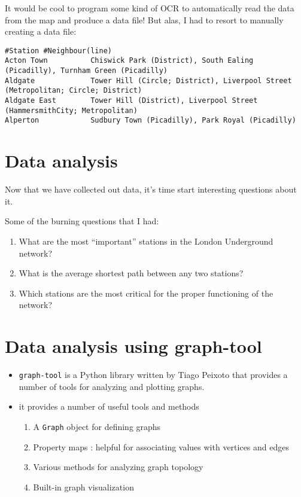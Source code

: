 \documentclass{article}
\begin{document}
It would be cool to program some kind of OCR to automatically read the
data from the map and produce a data file! But alas, I had to resort to
manually creating a data file:

\begin{verbatim}
#Station #Neighbour(line)
Acton Town          Chiswick Park (District), South Ealing (Picadilly), Turnham Green (Picadilly)
Aldgate             Tower Hill (Circle; District), Liverpool Street (Metropolitan; Circle; District)
Aldgate East        Tower Hill (District), Liverpool Street (HammersmithCity; Metropolitan)
Alperton            Sudbury Town (Picadilly), Park Royal (Picadilly)
\end{verbatim}

    \section{Data analysis}\label{data-analysis}

Now that we have collected out data, it's time start interesting
questions about it.

Some of the burning questions that I had:

\begin{enumerate}
\def\labelenumi{\arabic{enumi}.}
\itemsep1pt\parskip0pt
\item
  What are the most ``important'' stations in the London Underground
  network?
\item
  What is the average shortest path between any two stations?
\item
  Which stations are the most critical for the proper functioning of the
  network?
\end{enumerate}

    \section{Data analysis using
graph-tool}\label{data-analysis-using-graph-tool}

\begin{itemize}
\item
  \texttt{graph-tool} is a Python library written by Tiago Peixoto that
  provides a number of tools for analyzing and plotting graphs.
\item
  it provides a number of useful tools and methods

  \begin{enumerate}
  \def\labelenumi{\arabic{enumi}.}
  \itemsep1pt\parskip0pt
  \item
    A \texttt{Graph} object for defining graphs
  \item
    Property maps : helpful for associating values with vertices and
    edges
  \item
    Various methods for analyzing graph topology
  \item
    Built-in graph visualization
  \end{enumerate}
\end{itemize}
\end{document}
